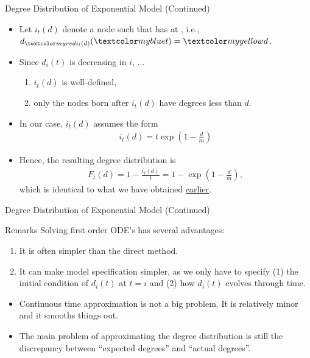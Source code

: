 \documentclass{beamer}
\begin{document}
\begin{frame}{Degree Distribution of Exponential Model (Continued)}
	\begin{itemize}
		\item
			Let $i_{t}(d)$ denote a node such that  has  at ,
			i.e., $d_{\red{i_{t}(d)}}(\blue{t})=\yellow{d}$.
		\item
			Since $d_{i}(t)$ is decreasing in $i$, ...
			\begin{enumerate}
				\item $i_{t}(d)$ is well-defined,
				\item only the nodes born after $i_t(d)$ have degrees less than $d$.
			\end{enumerate}
		\item
			In our case, $i_{t}(d)$ assumes the form
			\begin{align*}
				i_{t}(d) = t\exp\left(1-\frac{d}{m}\right)
			\end{align*}
		\item
			Hence, the resulting degree distribution is
			\begin{align*}
				F_{t}(d)
				= 1 - \frac{i_{t}(d)}{t}
				= 1 - \exp\left(1-\frac{d}{m}\right),
			\end{align*}
			which is identical to what we have obtained \hyperlink{eq:degree_distribution_direct}{earlier}.
	\end{itemize}
\end{frame}

\begin{frame}{Degree Distribution of Exponential Model (Continued)}
	\begin{block}{Remarks}
		Solving first order ODE's has several advantages:
		\begin{enumerate}
			\item
				It is often simpler than the direct method.
			\item
				It can make model specification simpler,
				as we only have to specify (1) the initial condition of $d_{i}(t)$ at $t=i$ and
				(2) how $d_{i}(t)$ evolves through time.
		\end{enumerate}
	\end{block}
	\begin{itemize}
		\item
			Continuous time approximation is not a big problem.
			It is relatively minor and it smooths things out.
		\item
			The main problem of approximating the degree distribution is still
			the discrepancy between ``expected degrees'' and ``actual degrees''.
	\end{itemize}
\end{frame}
\end{document}
